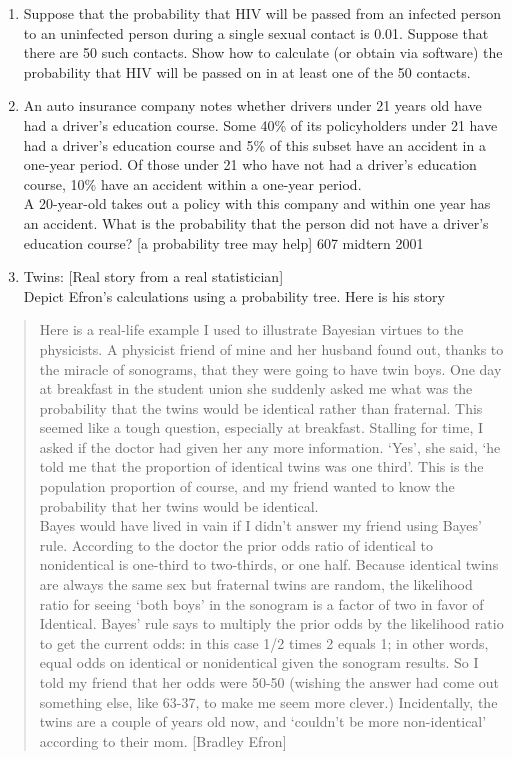 \documentclass[]{book}
\begin{document}
\begin{enumerate}
\item
  Suppose that the probability that HIV will be passed from an infected person to an uninfected person during a single sexual contact is 0.01. Suppose that there are 50 such contacts.
  Show how to calculate (or obtain via software) the probability that HIV will be passed on in at least one of the 50 contacts.
\item
  An auto insurance company notes whether drivers under 21 years old have had a driver's education course. Some 40\% of its policyholders under 21 have had a driver's education course and 5\% of this subset have an accident in a one-year period. Of those under 21 who have not had a driver's education course, 10\% have an accident within a one-year period.\\
  A 20-year-old takes out a policy with this company and within one year has an accident. What is the probability that the person did not have a driver's education course? {[}a probability tree may help{]} 607 midtern 2001
\item
  Twins: {[}Real story from a real statistician{]}\\
  Depict Efron's calculations using a probability tree. Here is his story
\end{enumerate}

\begin{quote}
Here is a real-life example I used to illustrate Bayesian virtues to the physicists. A physicist friend of mine and her husband found out, thanks to the miracle of sonograms, that they were going to have twin boys. One day at breakfast in the student union she suddenly asked me what was the probability that the twins would be identical rather than fraternal. This seemed like a tough question, especially at breakfast. Stalling for time, I asked if the doctor had given her any more information. `Yes', she said, `he told me that the proportion of identical twins was one third'. This is the population proportion of course, and my friend wanted to know the probability that her twins would be identical.\\
Bayes would have lived in vain if I didn't answer my friend using Bayes' rule. According to the doctor the prior odds ratio of identical to nonidentical is one-third to two-thirds, or one half. Because identical twins are always the same sex but fraternal twins are random, the likelihood ratio for seeing `both boys' in the sonogram is a factor of two in favor of Identical. Bayes' rule says to multiply the prior odds by the likelihood ratio to get the current odds: in this case 1/2 times 2 equals 1; in other words, equal odds on identical or nonidentical given the sonogram results. So I told my friend that her odds were 50-50 (wishing the answer had come out something else, like 63-37, to make me seem more clever.) Incidentally, the twins are a couple of years old now, and `couldn't be more non-identical' according to their mom. {[}Bradley Efron{]}
\end{quote}
\end{document}
